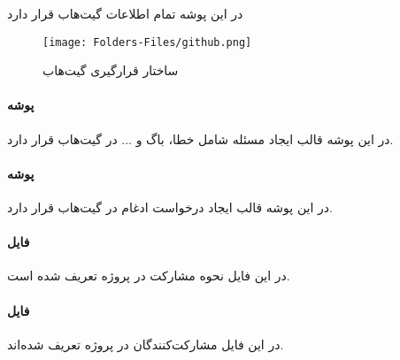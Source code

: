در این پوشه تمام اطلاعات گیت‌هاب قرار دارد

\begin{figure}[H]
	\texttt{[image: Folders-Files/github.png]}
	\centering
	\caption{ساختار قرارگیری گیت‌هاب}
	\label{fig:folder-github}
\end{figure}


\paragraph{پوشه }
در این پوشه قالب ایجاد مسئله شامل خطا، باگ و ... در گیت‌هاب قرار دارد.

\paragraph{پوشه }
در این پوشه قالب ایجاد درخواست ادغام در گیت‌هاب قرار دارد.

\paragraph{فایل }
در این فایل نحوه مشارکت در پروژه تعریف شده است.

\paragraph{فایل }
در این فایل مشارکت‌کنندگان در پروژه تعریف شده‌اند.
